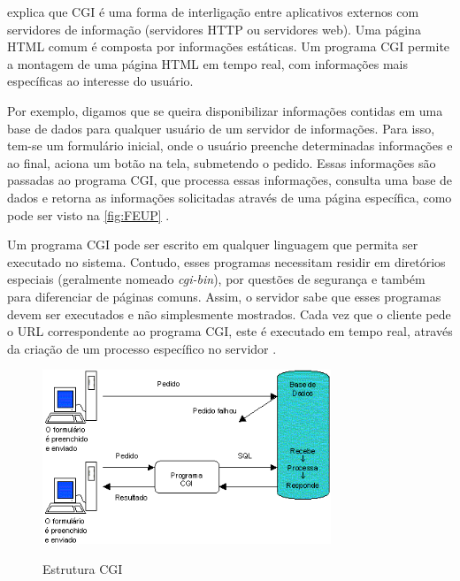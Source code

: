  explica que CGI é uma forma de interligação entre aplicativos externos com servidores de informação (servidores HTTP ou servidores web). Uma página HTML comum é composta por informações estáticas. Um programa CGI permite a montagem de uma página HTML em tempo real, com informações mais específicas ao interesse do usuário.

Por exemplo, digamos que se queira disponibilizar informações contidas em uma base de dados para qualquer usuário de um servidor de informações. Para isso, tem-se um formulário inicial, onde o usuário preenche determinadas informações e ao final, aciona um botão na tela, submetendo o pedido. Essas informações são passadas ao programa CGI, que processa essas informações, consulta uma base de dados e retorna as informações solicitadas através de uma página específica, como pode ser visto na \autoref{fig:FEUP} \cite{apache:corte}.

Um programa CGI pode ser escrito em qualquer linguagem que permita ser executado no sistema. Contudo, esses programas necessitam residir em diretórios especiais (geralmente nomeado \textit{cgi-bin}), por questões de segurança e também para diferenciar de páginas comuns. Assim, o servidor sabe que esses programas devem ser executados e não simplesmente mostrados. Cada vez que o cliente pede o URL correspondente ao programa CGI, este é executado em tempo real, através da criação de um processo específico no servidor \cite{apache:corte}.

\begin{figure}[H]
    \centering
    \caption{Estrutura CGI}
    \includegraphics[width=0.77\textwidth]{./dados/figuras/fig11}
    \label{fig:FEUP}
\end{figure}
